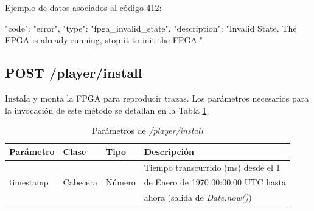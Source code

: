 \begin{itemize}
{\begin{minipage}{\textwidth}
Ejemplo de datos asociados al código 412:

\begin{code}[language=json]
{
  "code": "error",
  "type": "fpga_invalid_state",
  "description": "Invalid State. The FPGA is already running, stop it to init the FPGA."
}
\end{code}
\end{minipage}
}

\end{itemize}

%
%
\subsection{POST /player/install}
Instala y monta la \gls{FPGA} para reproducir \glspl{traza}. Los parámetros necesarios para la invocación de este método se detallan en la Tabla \ref{extra:api:playerinstall:invocacion}.

\begin{table}[H]
\centering
\begin{tabular}{|l|l|l|l|}
\hline
\rowcolor[HTML]{F5F5F5}
\textbf{Parámetro}  & \textbf{Clase} & \textbf{Tipo} & \textbf{Descripción}                  \\ \hline
                    &                &               & Tiempo transcurrido (ms) desde el 1   \\
timestamp           & Cabecera       & Número        & de Enero de 1970 00:00:00 UTC hasta   \\
                    &                &               & ahora (salida de \textit{Date.now()}) \\ \hline
\end{tabular}
\caption{Parámetros de \textit{/player/install}}
\label{extra:api:playerinstall:invocacion}
\end{table}

